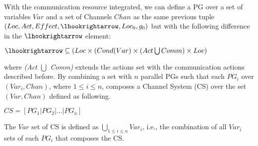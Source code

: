 With the communication resource integrated, we can define a PG over a set of variables $Var$ and a set of Channels $Chan$ as the same previous tuple $(Loc,Act,Effect,\lhookrightarrow,Loc_0,g_0)$ but with the following difference in the $\lhookrightarrow$ element:

\begin{center}
    $\lhookrightarrow \subseteq (Loc \times (Cond(Var) \times (Act \bigcup Comm) \times Loc)$
\end{center}

where \textit{(Act $\bigcup$ Comm)} extends the actions set with the communication actions described before. By combining a set with $n$ parallel PGs such that each $PG_i$ over $(Var_i, Chan)$, where $1 \leq i \leq n$, composes a Channel System (CS) over the set $(Var, Chan)$ defined as following.

\begin{center}
    $CS=[PG_1 | PG_2 | ... | PG_n]$
\end{center}

The $Var$ set of CS is defined as $\bigcup_{1 \leq i \leq n}Var_i$, i.e., the combination of all $Var_i$ sets of each $PG_i$ that composes the CS.
